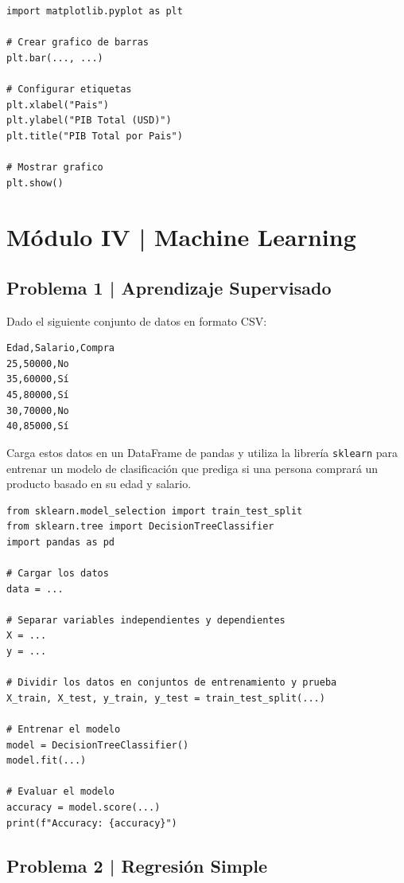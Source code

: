 \documentclass{article}
\begin{document}
\begin{lstlisting}[style=python]
import matplotlib.pyplot as plt

# Crear grafico de barras
plt.bar(..., ...)

# Configurar etiquetas
plt.xlabel("Pais")
plt.ylabel("PIB Total (USD)")
plt.title("PIB Total por Pais")

# Mostrar grafico
plt.show()
\end{lstlisting}

\section*{Módulo IV | Machine Learning}


\subsection*{Problema 1 | Aprendizaje Supervisado}

Dado el siguiente conjunto de datos en formato CSV:

\begin{verbatim}
Edad,Salario,Compra
25,50000,No
35,60000,Sí
45,80000,Sí
30,70000,No
40,85000,Sí
\end{verbatim}

Carga estos datos en un DataFrame de pandas y utiliza la librería \texttt{sklearn} para entrenar un modelo de clasificación que prediga si una persona comprará un producto basado en su edad y salario.

\begin{lstlisting}[style=python]
from sklearn.model_selection import train_test_split
from sklearn.tree import DecisionTreeClassifier
import pandas as pd

# Cargar los datos
data = ...

# Separar variables independientes y dependientes
X = ...
y = ...

# Dividir los datos en conjuntos de entrenamiento y prueba
X_train, X_test, y_train, y_test = train_test_split(...)

# Entrenar el modelo
model = DecisionTreeClassifier()
model.fit(...)

# Evaluar el modelo
accuracy = model.score(...)
print(f"Accuracy: {accuracy}")
\end{lstlisting}

\clearpage

\subsection*{Problema 2 | Regresión Simple}
\end{document}
